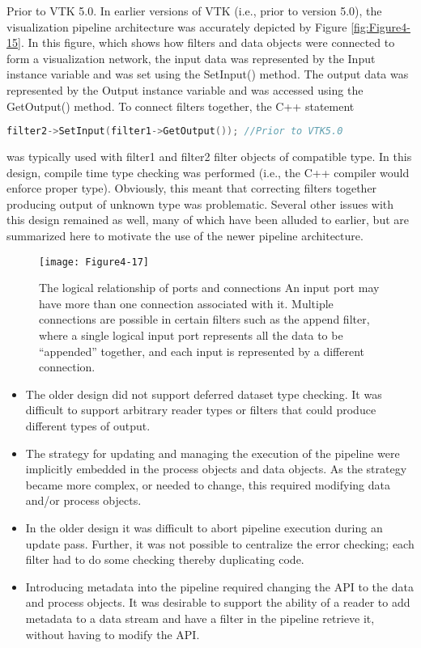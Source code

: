 Prior to VTK 5.0. In earlier versions of VTK (i.e., prior to version 5.0), the visualization pipeline architecture was accurately depicted by Figure \ref{fig:Figure4-15}. In this figure, which shows how filters and data objects were connected to form a visualization network, the input data was represented by the Input instance variable and was set using the SetInput() method. The output data was represented by the Output instance variable and was accessed using the GetOutput() method. To connect filters together, the C++ statement

\begin{lstlisting}[language=C++, caption={}, numbers=none, frame=none]
filter2->SetInput(filter1->GetOutput()); //Prior to VTK5.0
\end{lstlisting}

was typically used with filter1 and filter2 filter objects of compatible type. In this design, compile time type checking was performed (i.e., the C++ compiler would enforce proper type). Obviously, this meant that correcting filters together producing output of unknown type was problematic. Several other issues with this design remained as well, many of which have been alluded to earlier, but are summarized here to motivate the use of the newer pipeline architecture. 

\begin{figure}[!htb]
  \centering
  \texttt{[image: Figure4-17]}\\
  \caption{The logical relationship of ports and connections An input port may have more than one connection associated with it. Multiple connections are possible in certain filters such as the append filter, where a single logical input port represents all the data to be ``appended'' together, and each input is represented by a different connection.}\label{fig:Figure4-17}
\end{figure}

\begin{itemize}
\item The older design did not support deferred dataset type checking. It was difficult to support arbitrary reader types or filters that could produce different types of output.

\item The strategy for updating and managing the execution of the pipeline were implicitly embedded in the process objects and data objects. As the strategy became more complex, or needed to change, this required modifying data and/or process objects.

\item In the older design it was difficult to abort pipeline execution during an update pass. Further, it was not possible to centralize the error checking; each filter had to do some checking thereby duplicating code.

\item Introducing metadata into the pipeline required changing the API to the data and process objects. It was desirable to support the ability of a reader to add metadata to a data stream and have a filter in the pipeline retrieve it, without having to modify the API.
\end{itemize}

